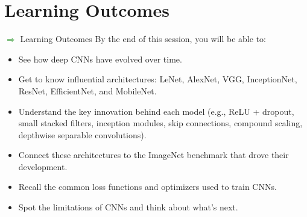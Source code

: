 \section{Learning Outcomes}
\begin{frame}[allowframebreaks]{\textcolor{green}{$\Rightarrow$} Learning Outcomes}
    By the end of this session, you will be able to:
        \begin{itemize}
            \item See how deep CNNs have evolved over time.
            \item Get to know influential architectures: LeNet, AlexNet, VGG, InceptionNet, ResNet, EfficientNet, and MobileNet.
            \item Understand the key innovation behind each model (e.g., ReLU + dropout, small stacked filters, inception modules, skip connections, compound scaling, depthwise separable convolutions).
            \item Connect these architectures to the ImageNet benchmark that drove their development.
            \item Recall the common loss functions and optimizers used to train CNNs.
            \item Spot the limitations of CNNs and think about what’s next.
        \end{itemize}
\end{frame}